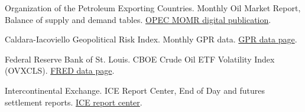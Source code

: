 \begin{enumerate}[label={[\arabic*]},leftmargin=2.2em,itemsep=0.42em,topsep=0.25em]
\item
Organization of the Petroleum Exporting Countries. Monthly Oil Market Report, Balance of supply and demand tables. \href{https://publications.opec.org/momr/chapter/147/2738}{OPEC MOMR digital publication}.

\item
Caldara-Iacoviello Geopolitical Risk Index. Monthly GPR data. \href{https://www.matteoiacoviello.com/gpr.htm}{GPR data page}.

\item
Federal Reserve Bank of St. Louis. CBOE Crude Oil ETF Volatility Index (OVXCLS). \href{https://fred.stlouisfed.org/series/OVXCLS}{FRED data page}.

\item
Intercontinental Exchange. ICE Report Center, End of Day and futures settlement reports. \href{https://www.ice.com/report/83}{ICE report center}.

\end{enumerate}
